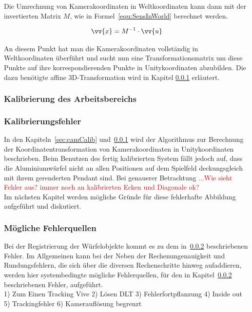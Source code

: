 Die Umrechnung von Kamerakoordinaten in Weltkoordinaten kann dann mit der invertierten Matrix $M$, wie in Formel~\ref{equ:SensInWorld} berechnet werden. \

\begin{equation}
\label{equ:SensInWorld}
\vv{x} = M^{-1} \cdot \vv{u}
\end{equation}

An diesem Punkt hat man die Kamerakoordinaten vollständig in Weltkoordinaten überführt und sucht nun eine Transformationsmatrix um diese Punkte auf ihre korrespondierenden Punkte in Unitykoordinaten abzubilden. Die dazu benötigte affine 3D-Transformation wird in Kapitel \ref{sec:planeCalib} erläutert.


\subsubsection{Kalibrierung des Arbeitsbereichs}\label{sec:planeCalib} 

\subsubsection{Kalibrierungsfehler} \label{sec:calibError}
In den Kapiteln~\ref{sec:camCalib} und~\ref{sec:planeCalib} wird der Algorithmus zur Berechnung der Koordinatentransformation von Kamerakoordinaten in Unitykoordinaten beschrieben. Beim Benutzen des fertig kalibrierten System fällt jedoch auf, dass die Aluminiumwürfel nicht an allen Positionen auf dem Spielfeld deckungsgleich mit ihrem gerenderten Pendant sind.  Bei genauerer Betrachtung \textcolor{red}{...Wie sieht Fehler aus? immer noch an kalibrierten Ecken und Diagonale ok?}\\
Im nächsten Kapitel werden mögliche Gründe für diese fehlerhafte Abbildung aufgeführt und diskutiert. 


\subsubsection{Mögliche Fehlerquellen} \label{sec:calibErrorSources}
Bei der Registrierung der Würfelobjekte kommt es zu dem in~\ref{sec:calibError} beschriebenen Fehler. Im Allgemeinen kann bei der  
Neben der Rechenungenauigkeit und Rundungsfehlern, die sich über die diversen Rechenschritte hinweg aufaddieren, werden hier systembedingte mögliche Fehlerquellen, für den in Kapitel~\ref{sec:calibError} beschriebenen Fehler, aufgeführt. \\
1) Zum Einen Tracking Vive
2) Lösen DLT
3) Fehlerfortpflanzung
4) Inside out
5) Trackingfehler
6) Kamerauflösung begrenzt


